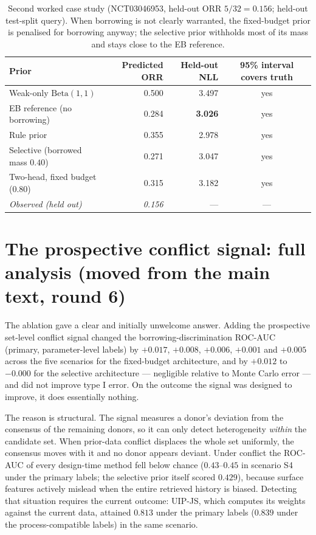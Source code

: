 \documentclass[11pt]{article}
\begin{document}
\begin{table}[htbp]
\centering
\caption{Second worked case study (NCT03046953, held-out ORR
$5/32 = 0.156$; held-out test-split query). When borrowing is not clearly
warranted, the fixed-budget prior is penalised for borrowing anyway; the
selective prior withholds most of its mass and stays close to the EB
reference.}
\begin{tabular}{lrrc}
\toprule
Prior & Predicted ORR & Held-out NLL & 95\% interval covers truth \\
\midrule
Weak-only $\mathrm{Beta}(1,1)$ & 0.500 & 3.497 & yes \\
EB reference (no borrowing) & 0.284 & \textbf{3.026} & yes \\
Rule prior & 0.355 & 2.978 & yes \\
Selective (borrowed mass $0.40$) & 0.271 & 3.047 & yes \\
Two-head, fixed budget ($0.80$) & 0.315 & 3.182 & yes \\
\textit{Observed (held out)} & \textit{0.156} & --- & --- \\
\bottomrule
\end{tabular}
\end{table}

\section{The prospective conflict signal: full analysis (moved from the
main text, round 6)}

The ablation gave a clear and initially unwelcome answer. Adding the
prospective set-level conflict signal changed the borrowing-discrimination
ROC-AUC (primary, parameter-level labels) by $+0.017$, $+0.008$, $+0.006$,
$+0.001$ and $+0.005$ across the five scenarios for the fixed-budget
architecture, and by $+0.012$ to $-0.000$ for the selective architecture
--- negligible relative to Monte Carlo error --- and did not improve type
I error. On the outcome the signal was designed to improve, it does
essentially nothing.

The reason is structural. The signal measures a donor's deviation from
the consensus of the remaining donors, so it can only detect
heterogeneity \emph{within} the candidate set. When prior-data conflict
displaces the whole set uniformly, the consensus moves with it and no
donor appears deviant. Under conflict the ROC-AUC of every design-time
method fell below chance ($0.43$--$0.45$ in scenario S4 under the primary
labels; the selective prior itself scored $0.429$), because surface
features actively mislead when the entire retrieved history is biased.
Detecting that situation requires the current outcome: UIP-JS, which
computes its weights against the current data, attained $0.813$ under the
primary labels ($0.839$ under the process-compatible labels) in the same
scenario.
\end{document}
